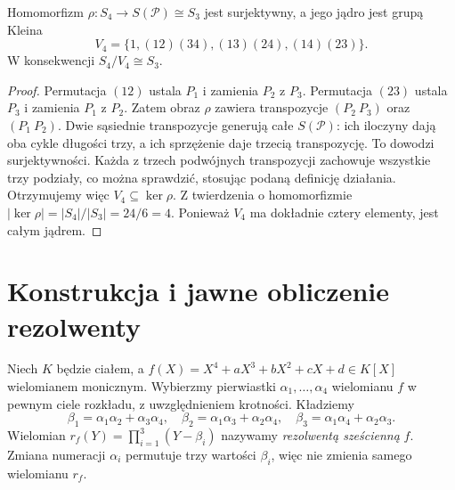 \begin{twierdzenie}\label{aa:tw:s4-v4}
Homomorfizm $\rho:S_4\to S(\mathcal P)\cong S_3$ jest surjektywny,
a jego jądro jest grupą Kleina
\[
 V_4=\{1,(12)(34),(13)(24),(14)(23)\}.
\]
W konsekwencji $S_4/V_4\cong S_3$.
\end{twierdzenie}
\begin{proof}
Permutacja $(12)$ ustala $P_1$ i zamienia $P_2$ z $P_3$.
Permutacja $(23)$ ustala $P_3$ i zamienia $P_1$ z $P_2$.
Zatem obraz $\rho$ zawiera transpozycje $(P_2\ P_3)$
oraz $(P_1\ P_2)$. Dwie sąsiednie transpozycje generują
całe $S(\mathcal P)$: ich iloczyny dają oba cykle długości trzy,
a ich sprzężenie daje trzecią transpozycję. To dowodzi surjektywności.
Każda z trzech podwójnych transpozycji zachowuje wszystkie trzy
podziały, co można sprawdzić, stosując podaną definicję działania.
Otrzymujemy więc $V_4\subseteq\ker\rho$. Z twierdzenia o homomorfizmie
$|\ker\rho|=|S_4|/|S_3|=24/6=4$.
Ponieważ $V_4$ ma dokładnie cztery elementy, jest całym jądrem.
\end{proof}

\section{Konstrukcja i jawne obliczenie rezolwenty}
\begin{definicja}\label{aa:def:quartic-resolvent}
Niech $K$ będzie ciałem, a
$f(X)=X^4+aX^3+bX^2+cX+d\in K[X]$ wielomianem monicznym.
Wybierzmy pierwiastki $\alpha_1,\ldots,\alpha_4$ wielomianu $f$
w pewnym ciele rozkładu, z uwzględnieniem krotności. Kładziemy
\[
 \beta_1=\alpha_1\alpha_2+\alpha_3\alpha_4,\quad
 \beta_2=\alpha_1\alpha_3+\alpha_2\alpha_4,\quad
 \beta_3=\alpha_1\alpha_4+\alpha_2\alpha_3.
\]
Wielomian $r_f(Y)=\prod_{i=1}^{3}(Y-\beta_i)$ nazywamy
\emph{rezolwentą sześcienną} $f$.
Zmiana numeracji $\alpha_i$ permutuje trzy wartości $\beta_i$,
więc nie zmienia samego wielomianu $r_f$.
\end{definicja}


